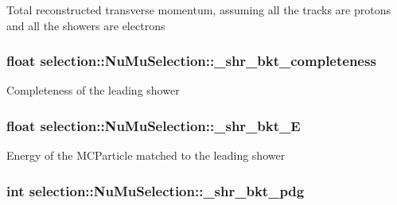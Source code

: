 Total reconstructed transverse momentum, assuming all the tracks are protons and all the showers are electrons \hypertarget{classselection_1_1NuMuSelection_a18224668e51654b8322757c2db5d8b9d}{
\subsubsection[{\-\_\-shr\-\_\-bkt\-\_\-completeness}]{\setlength{\rightskip}{0pt plus 5cm}float selection\-::\-Nu\-Mu\-Selection\-::\-\_\-shr\-\_\-bkt\-\_\-completeness\hspace{0.3cm}{\ttfamily [private]}}}\label{classselection_1_1NuMuSelection_a18224668e51654b8322757c2db5d8b9d}
Completeness of the leading shower \hypertarget{classselection_1_1NuMuSelection_aa6e475979c9554cb14bf7a082385a128}{
\subsubsection[{\-\_\-shr\-\_\-bkt\-\_\-\-E}]{\setlength{\rightskip}{0pt plus 5cm}float selection\-::\-Nu\-Mu\-Selection\-::\-\_\-shr\-\_\-bkt\-\_\-\-E\hspace{0.3cm}{\ttfamily [private]}}}\label{classselection_1_1NuMuSelection_aa6e475979c9554cb14bf7a082385a128}
Energy of the M\-C\-Particle matched to the leading shower \hypertarget{classselection_1_1NuMuSelection_ab5695d0d13afa6fe27e38b63951ade58}{
\subsubsection[{\-\_\-shr\-\_\-bkt\-\_\-pdg}]{\setlength{\rightskip}{0pt plus 5cm}int selection\-::\-Nu\-Mu\-Selection\-::\-\_\-shr\-\_\-bkt\-\_\-pdg\hspace{0.3cm}{\ttfamily [private]}}}\label{classselection_1_1NuMuSelection_ab5695d0d13afa6fe27e38b63951ade58}
